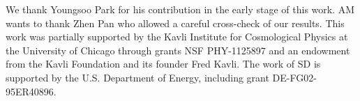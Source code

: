 \documentclass[aps,prd,reprint,superscriptaddress]{revtex4-1}
\begin{document}




\begin{acknowledgments}
We thank Youngsoo Park for his contribution in the early stage of this work.
AM wants to thank Zhen Pan who allowed a careful cross-check of our results.
This work was partially supported by the Kavli Institute for Cosmological Physics at the University of Chicago through grants NSF PHY-1125897 and an endowment from the Kavli Foundation and its founder Fred Kavli.
The work of SD is supported by the U.S. Department of Energy, including grant DE-FG02-95ER40896.
\end{acknowledgments}


\end{document}
